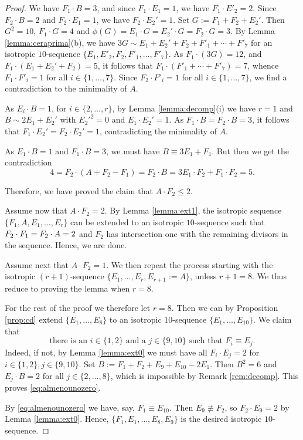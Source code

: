 \documentclass[11pt]{amsart}
\theoremstyle{definition}
\begin{document}
\begin{proof}
We have $F_1\cdot B=3$, and since $F_1\cdot E_1=1$, we have $F_1\cdot E'_2=2$. 
Since $F_2\cdot B=2$ and $F_2\cdot E_1=1$, we have  $F_2 \cdot E_2'=1$. 
Set $G:= F_1+F_2+E_2'$. Then $G^2=10$, $F_1 \cdot G=4$ and $\phi(G)=E_1 \cdot G = E_2' \cdot G = F_2 \cdot G=3$.  By Lemma \ref{lemma:ceraprima}(b), we have 
 $3G \sim E_1+E_2' + F_2+F'_1 + \cdots + F'_7$ for an isotropic $10$-sequence $\{E_1,E'_2,F_2,F'_1,\ldots,F'_7\}$.  As $F_1 \cdot (3G)=12$, and $F_1\cdot (E_1+E_2' + F_2)=5$, it follows that 
$F_1 \cdot (F'_1 + \cdots + F'_7)=7$, whence $F_1 \cdot F'_i=1$ for all $i \in\{1,\ldots,7\}$. Since $F_2\cdot F'_i=1$ for  all $i \in\{1,\ldots,7\}$, we find a contradiction to the minimality of $A$. \medskip

 As $E_i \cdot B=1$,  for $i \in \{2,\ldots,r\}$, by Lemma \ref {lemma:decomp}(i) we have $r=1$ and  $B \sim 2E_1+E_2'$ with ${E_2'}^2=0$ and $E_1 \cdot E_2'=1$.  
As $F_1 \cdot B=F_2 \cdot B=3$, it follows that
$F_1 \cdot E_2'=F_2 \cdot E_2'=1$, contradicting the minimality of $A$.\medskip

 As $E_1 \cdot B=1$ and $F_1 \cdot B=3$, we must have $B \equiv 3E_1+F_1$. But then we get  the contradiction
\[ 4=F_2 \cdot (A+F_2-F_1)=F_2 \cdot B = 3E_1 \cdot F_2+ F_1 \cdot F_2=5.\]

\medskip

Therefore, we have proved the claim that $A \cdot F_2 \leqslant 2$. \medskip

 Assume now that $A \cdot F_2 =2$.  By Lemma \ref{lemma:ext1}, the isotropic sequence $\{F_1,A,E_1,\ldots,E_r\}$ can be extended to an isotropic  $10$-sequence such that  $F_2 \cdot F_1=F_2 \cdot A\color{black}=2$ \color{black} and $F_2$ has intersection  one with the remaining divisors in the sequence. Hence, we are done.

 Assume next that $A \cdot F_2=1$. We then   repeat the process starting with the isotropic $(r+1)$-sequence $\{E_1,\ldots,E_r,E_{r+1}:=A\}$, unless $r+1=8$. We thus reduce to proving the  lemma when  $r=8$. 

 For the rest of the proof we therefore let $r=8$. Then  we can by  Proposition \ref{prop:cd} 
extend $\{E_1,\ldots, E_8\}$ to an isotropic $10$-sequence $\{E_1,\ldots,E_{10}\}$. We  claim that
\begin{equation}
  \label{eq:almenounozero}
 \mbox{there is an $i \in \{1,2\}$ and a $j \in \{9,10\}$ such that $F_i \equiv E_j$.}
\end{equation}
 Indeed, if not, by Lemma \ref{lemma:ext0} we must have 
all $F_i \cdot E_j=2$ for $i \in \{1,2\}, j \in \{9,10\}$. Set $B:= F_1+F_2+E_9+E_{10}-2E_1$. Then $B^2=6$ and $E_j \cdot B=2$ for all $j \in \{2,\ldots,8\}$, which is impossible by Remark \ref{rem:decomp}. This proves \eqref{eq:almenounozero}. 

By \eqref{eq:almenounozero} we have, say, $F_1 \equiv E_{10}$. Then $E_9 \not \equiv F_2$, so $F_2 \cdot E_9=2$ by Lemma \ref{lemma:ext0}.  Hence, $\{F_1,E_1,\ldots,E_8,E_9\}$ is the desired isotropic $10$-sequence.
\end{proof}
\end{document}
